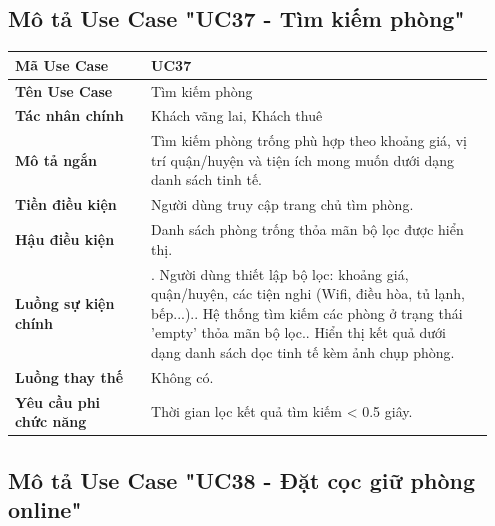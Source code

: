 \documentclass[a4paper,oneside]{report}
\begin{document}
\subsection{Mô tả Use Case "UC37 - Tìm kiếm phòng"}

\begin{longtable}[]{@{}>{\RaggedRight\arraybackslash}p{0.27\linewidth}>{\RaggedRight\arraybackslash}p{0.68\linewidth}@{}}
\toprule
\textbf{Mã Use Case} & UC37\tabularnewline
\midrule
\endhead
\textbf{Tên Use Case} & Tìm kiếm phòng\tabularnewline
\textbf{Tác nhân chính} & Khách vãng lai, Khách thuê\tabularnewline
\textbf{Mô tả ngắn} & Tìm kiếm phòng trống phù hợp theo khoảng giá, vị
trí quận/huyện và tiện ích mong muốn dưới dạng danh sách tinh
tế.\tabularnewline
\textbf{Tiền điều kiện} & Người dùng truy cập trang chủ tìm
phòng.\tabularnewline
\textbf{Hậu điều kiện} & Danh sách phòng trống thỏa mãn bộ lọc được hiển
thị.\tabularnewline
\textbf{Luồng sự kiện chính} & 1. Người dùng thiết
lập bộ lọc: khoảng giá, quận/huyện, các tiện nghi (Wifi, điều hòa, tủ
lạnh, bếp...).\newline 2. Hệ thống tìm kiếm các phòng ở trạng thái
'empty' thỏa mãn bộ lọc.\newline 3. Hiển thị kết quả dưới dạng danh
sách dọc tinh tế kèm ảnh chụp phòng.\tabularnewline
\textbf{Luồng thay thế} & Không có.\tabularnewline
\textbf{Yêu cầu phi chức năng} & Thời gian lọc kết quả tìm kiếm
\textless{} 0.5 giây.\tabularnewline
\bottomrule
\end{longtable}

\subsection{Mô tả Use Case "UC38 - Đặt cọc giữ phòng online"}
\end{document}

